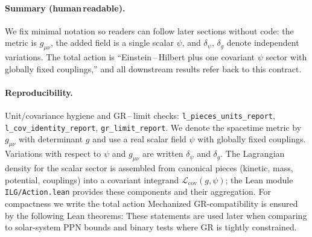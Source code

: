 \documentclass[aps,prd,twocolumn,superscriptaddress,nofootinbib,floatfix,longbibliography]{revtex4-2}
\newcommand{\dd}{\mathrm{d}}
\newcommand{\Lag}{\mathcal{L}}
\newcommand{\Action}{\mathcal{S}}
\newcommand{\lean}[1]{\texttt{\detokenize{#1}}}
\begin{document}
\paragraph*{Summary (human\,readable).}
We fix minimal notation so readers can follow later sections without code: the metric is $g_{\mu\nu}$, the added field is a single scalar $\psi$, and $\delta_\psi,\,\delta_g$ denote independent variations. The total action is “Einstein\,–\,Hilbert plus one covariant $\psi$ sector with globally fixed couplings,” and all downstream results refer back to this contract.
\paragraph*{Reproducibility.}
Unit/covariance hygiene and GR\,–\,limit checks: \texttt{l\_pieces\_units\_report}, \texttt{l\_cov\_identity\_report}, \texttt{gr\_limit\_report}.
We denote the spacetime metric by $g_{\mu\nu}$ with determinant $g$ and use a real scalar field $\psi$ with globally fixed couplings. Variations with respect to $\psi$ and $g_{\mu\nu}$ are written $\delta_\psi$ and $\delta_g$. The Lagrangian density for the scalar sector is assembled from canonical pieces (kinetic, mass, potential, couplings) into a covariant integrand $\Lag_{\mathrm{cov}}(g,\psi)$; the Lean module \texttt{ILG/Action.lean} provides these components and their aggregation. For compactness we write the total action
%
Mechanized GR-compatibility is ensured by the following Lean theorems:
These statements are used later when comparing to solar-system PPN bounds and binary tests where GR is tightly constrained.
%
\end{document}

